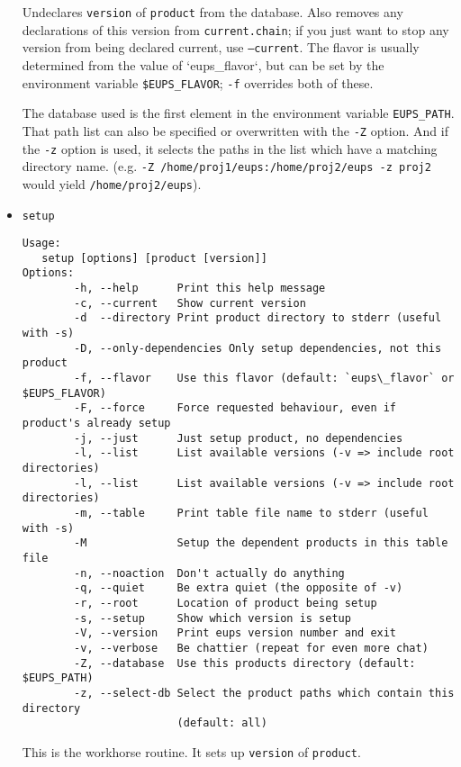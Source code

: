 \documentclass{article}
\newcommand{\code}[1]{\texttt{#1}}
\begin{document}
\begin{itemize}
Undeclares \code{version} of \code{product} from the database. Also
removes any declarations of this version from \code{current.chain}; if
you just want to stop any version from being declared current, use
\code{--current}. The flavor is usually determined from the value
of `eups\_flavor`, but can be set by the
environment variable \code{\$EUPS\_FLAVOR}; \code{-f} overrides
both of these.

The database used is the first element in the environment
variable \code{EUPS\_PATH}. That path list can also be specified or
overwritten with the \code{-Z} option. And if the \code{-z} option is
used, it selects the paths in the list which have a matching directory
name. (e.g. \code{-Z /home/proj1/eups:/home/proj2/eups -z proj2} would
yield \code{/home/proj2/eups}).


\item \code{setup}
\begin{verbatim}
Usage:
   setup [options] [product [version]]
Options:
        -h, --help      Print this help message
        -c, --current   Show current version
        -d  --directory Print product directory to stderr (useful with -s)
        -D, --only-dependencies Only setup dependencies, not this product	
        -f, --flavor    Use this flavor (default: `eups\_flavor` or $EUPS_FLAVOR)
        -F, --force     Force requested behaviour, even if product's already setup
        -j, --just      Just setup product, no dependencies
        -l, --list      List available versions (-v => include root directories)
        -l, --list      List available versions (-v => include root directories)
        -m, --table     Print table file name to stderr (useful with -s)
        -M              Setup the dependent products in this table file
        -n, --noaction  Don't actually do anything
        -q, --quiet     Be extra quiet (the opposite of -v)
        -r, --root      Location of product being setup
        -s, --setup     Show which version is setup
        -V, --version   Print eups version number and exit
        -v, --verbose   Be chattier (repeat for even more chat)
        -Z, --database  Use this products directory (default: $EUPS_PATH)
        -z, --select-db Select the product paths which contain this directory 
                        (default: all)
\end{verbatim}

This is the workhorse routine. It sets up \code{version} of \code{product}.


\end{itemize}
\end{document}
